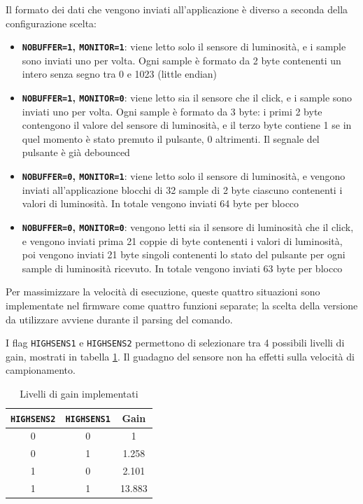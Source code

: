 Il formato dei dati che vengono inviati all'applicazione è diverso a seconda della configurazione scelta:
\begin{itemize}
	\item \textbf{\texttt{NOBUFFER=1}, \texttt{MONITOR=1}}: viene letto solo il sensore di luminosità, e i sample sono inviati uno per volta. Ogni sample è formato da 2 byte contenenti un intero senza segno tra 0 e 1023 (little endian)
	\item \textbf{\texttt{NOBUFFER=1}, \texttt{MONITOR=0}}: viene letto sia il sensore che il click, e i sample sono inviati uno per volta. Ogni sample è formato da 3 byte: i primi 2 byte contengono il valore del sensore di luminosità, e il terzo byte contiene 1 se in quel momento è stato premuto il pulsante, 0 altrimenti. Il segnale del pulsante è già debounced
	\item \textbf{\texttt{NOBUFFER=0}, \texttt{MONITOR=1}}: viene letto solo il sensore di luminosità, e vengono inviati all'applicazione blocchi di 32 sample di 2 byte ciascuno contenenti i valori di luminosità. In totale vengono inviati 64 byte per blocco
	\item \textbf{\texttt{NOBUFFER=0}, \texttt{MONITOR=0}}: vengono letti sia il sensore di luminosità che il click, e vengono inviati prima 21 coppie di byte contenenti i valori di luminosità, poi vengono inviati 21 byte singoli contenenti lo stato del pulsante per ogni sample di luminosità ricevuto. In totale vengono inviati 63 byte per blocco
\end{itemize}

Per massimizzare la velocità di esecuzione, queste quattro situazioni sono implementate nel firmware come quattro funzioni separate; la scelta della versione da utilizzare avviene durante il parsing del comando.

I flag \texttt{HIGHSENS1} e \texttt{HIGHSENS2} permettono di selezionare tra 4 possibili livelli di gain, mostrati in tabella \ref{tab:openldat_gains}. Il guadagno del sensore non ha effetti sulla velocità di campionamento.
\begin{table}[h!]
	\centering
	\begin{tabular}{|c|c|c|} 
		\hline
		\texttt{HIGHSENS2} & \texttt{HIGHSENS1} & \textbf{Gain}  \\ 
		\hline
		0 & 0 & 1         \\ 
		\hline
		0 & 1 & 1.258         \\ 
		\hline
		1 & 0 & 2.101         \\ 
		\hline
		1 & 1 & 13.883         \\ 
		\hline
	\end{tabular}
	\caption{\label{tab:openldat_gains}Livelli di gain implementati}
\end{table}

